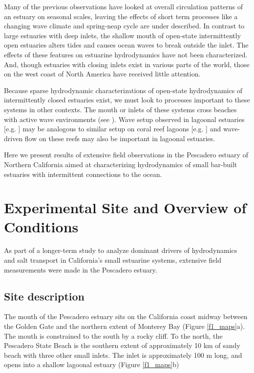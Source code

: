 Many of the previous observations have looked at overall circulation
patterns of an estuary on seasonal scales, leaving the effects of
short term processes like a changing wave climate and spring-neap
cycle are under described. In contrast to large estuaries with deep
inlets, the shallow mouth of open-state intermittently open estuaries
alters tides and causes ocean waves to break outside the inlet. The
effects of these features on estuarine hydrodynamics have not been
characterized. And, though estuaries with closing inlets exist in
various parts of the world, those on the west coast of North America
have received little attention. 

Because sparse hydrodynamic characterizations of open-state hydrodynamics
of intermittently closed estuaries exist, we must look to processes
important to these systems in other contexts. The mouth or inlets
of these systems cross beaches with active wave environments (see
\citealp{mei_liu_1993,battjes_1988}). Wave setup observed in lagoonal
estuaries {[}e.g. \citealp{malhadas_etal_2009}{]} may be analogous
to similar setup on coral reef lagoons {[}e.g. \citealp{becker_etal_2014}{]}
and wave-driven flow on these reefs \citep{monismith_2007} may also
be important in lagoonal estuaries. 

Here we present results of extensive field observations in the Pescadero
estuary of Northern California aimed at characterizing hydrodynamics
of small bar-built estuaries with intermittent connections to the
ocean. 



\section{Experimental Site and Overview of Conditions}

As part of a longer-term study to analyze dominant drivers of hydrodynamics
and salt transport in California's small estuarine systems, extensive
field measurements were made in the Pescadero estuary.


\subsection{Site description }

The mouth of the Pescadero estuary sits on the California coast midway
between the Golden Gate and the northern extent of Monterey Bay (Figure
\ref{f1_maps}a). The mouth is constrained to the south by a rocky
cliff. To the north, the Pescadero State Beach is the southern extent
of approximately 10 km of sandy beach with three other small inlets.
The inlet is approximately 100 m long, and opens into a shallow lagoonal
estuary (Figure \ref{f1_maps}b) 

